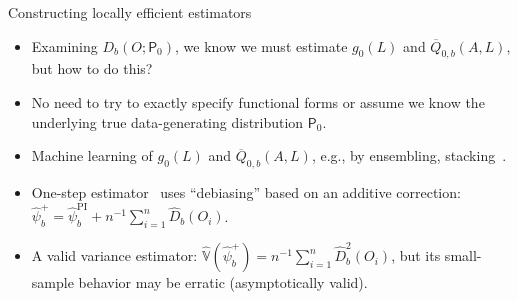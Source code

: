 \documentclass{beamer}
\begin{document}
\begin{frame}[c]{Constructing locally efficient estimators}

\begin{center}
\begin{itemize}
  \itemsep6pt
  \item Examining $D_b(O; \mathsf{P}_0)$, we know we must estimate $g_0(L)$ and
    $\overline{Q}_{0,b}(A,L)$, but how to do this?
  \item No need to try to exactly specify functional forms or assume we know the
    underlying true data-generating distribution $\mathsf{P}_0$.
  \item Machine learning of $g_0(L)$ and $\overline{Q}_{0,b}(A,L)$, e.g., by
    ensembling, stacking~\citep{vdl2007super, breiman1996stacked}.
  \item One-step estimator~\citep{bickel1993efficient} uses ``debiasing'' based
    on an additive correction:
    $\hat{\psi}_{b}^{+} = \hat{\psi}_{b}^{\text{PI}} +
    n^{-1} \sum_{i=1}^n \hat{D}_b(O_i)$.
  \item A valid variance estimator: $\hat{\mathbb{V}}(\hat{\psi}_b^{+}) =
    n^{-1} \sum_{i=1}^n \hat{D}_b^2(O_i)$, but its small-sample behavior may be
    erratic (asymptotically valid).
\end{itemize}
\end{center}

\end{frame}

\end{document}
